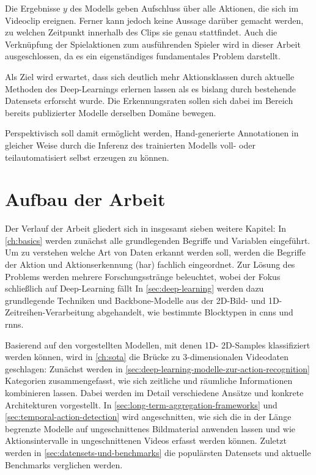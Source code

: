 Die Ergebnisse $y$ des Modells geben Aufschluss über alle Aktionen, die sich im Videoclip ereignen.
Ferner kann jedoch keine Aussage darüber gemacht werden, zu welchen Zeitpunkt innerhalb des Clips sie genau stattfindet.
Auch die Verknüpfung der Spielaktionen zum ausführenden Spieler wird in dieser Arbeit ausgeschlossen, da es ein eigenständiges fundamentales Problem darstellt.

Als Ziel wird erwartet, dass sich deutlich mehr Aktionsklassen durch aktuelle Methoden des Deep-Learnings erlernen lassen als es bislang durch bestehende Datensets erforscht wurde.
Die Erkennungsraten sollen sich dabei im Bereich bereits publizierter Modelle derselben Domäne bewegen.

Perspektivisch soll damit ermöglicht werden, Hand-generierte Annotationen in gleicher Weise durch die Inferenz des trainierten Modells voll- oder teilautomatisiert selbst erzeugen zu können.

\section{Aufbau der Arbeit}
\label{sec:aufbau-der-arbeit}

Der Verlauf der Arbeit gliedert sich in insgesamt sieben weitere Kapitel:
In \autoref{ch:basics} werden zunächst alle grundlegenden Begriffe und Variablen eingeführt.
Um zu verstehen welche Art von Daten erkannt werden soll, werden die Begriffe der Aktion und Aktionserkennung (\gls{har}) fachlich eingeordnet.
Zur Lösung des Problems werden mehrere Forschungsstränge beleuchtet, wobei der Fokus schließlich auf Deep-Learning fällt
In \autoref{sec:deep-learning} werden dazu grundlegende Techniken und Backbone-Modelle aus der 2D-Bild- und 1D-Zeitreihen-Verarbeitung abgehandelt, wie bestimmte Blocktypen in \glspl{cnn} und \glspl{rnn}.

Basierend auf den vorgestellten Modellen, mit denen 1D- \bzw 2D-Samples klassifiziert werden können, wird in \autoref{ch:sota} die Brücke zu 3-dimensionalen Videodaten geschlagen:
Zunächst werden in \autoref{sec:deep-learning-modelle-zur-action-recognition} Kategorien zusammengefasst, wie sich zeitliche und räumliche Informationen kombinieren lassen.
Dabei werden im Detail verschiedene Ansätze und konkrete Architekturen vorgestellt.
In \autoref{sec:long-term-aggregation-frameworks} und \autoref{sec:temporal-action-detection} wird angeschnitten, wie sich die in der Länge begrenzte Modelle auf ungeschnittenes Bildmaterial anwenden lassen und wie Aktionsintervalle in ungeschnittenen Videos erfasst werden können.
Zuletzt werden in \autoref{sec:datensets-und-benchmarks} die populärsten Datensets und aktuelle Benchmarks verglichen werden.

